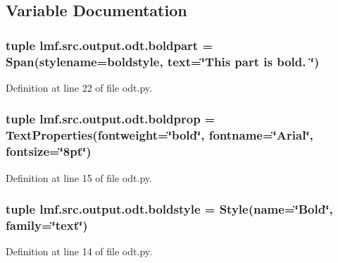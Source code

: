 \subsection{Variable Documentation}
\hypertarget{namespacelmf_1_1src_1_1output_1_1odt_a191027189751a24a5105e7593a1b7d49}{
\subsubsection[{boldpart}]{\setlength{\rightskip}{0pt plus 5cm}tuple lmf.\+src.\+output.\+odt.\+boldpart = Span(stylename={\bf boldstyle}, text=\char`\"{}This part is bold. \char`\"{})}}\label{namespacelmf_1_1src_1_1output_1_1odt_a191027189751a24a5105e7593a1b7d49}


Definition at line 22 of file odt.\+py.

\hypertarget{namespacelmf_1_1src_1_1output_1_1odt_a883b09afc4579bcc6f02a3c630ac1aa6}{
\subsubsection[{boldprop}]{\setlength{\rightskip}{0pt plus 5cm}tuple lmf.\+src.\+output.\+odt.\+boldprop = Text\+Properties(fontweight=\char`\"{}bold\char`\"{}, fontname=\char`\"{}Arial\char`\"{}, fontsize=\char`\"{}8pt\char`\"{})}}\label{namespacelmf_1_1src_1_1output_1_1odt_a883b09afc4579bcc6f02a3c630ac1aa6}


Definition at line 15 of file odt.\+py.

\hypertarget{namespacelmf_1_1src_1_1output_1_1odt_ae89ed401433d97b22c3a45cd267c6b75}{
\subsubsection[{boldstyle}]{\setlength{\rightskip}{0pt plus 5cm}tuple lmf.\+src.\+output.\+odt.\+boldstyle = Style(name=\char`\"{}Bold\char`\"{}, family=\char`\"{}text\char`\"{})}}\label{namespacelmf_1_1src_1_1output_1_1odt_ae89ed401433d97b22c3a45cd267c6b75}


Definition at line 14 of file odt.\+py.


